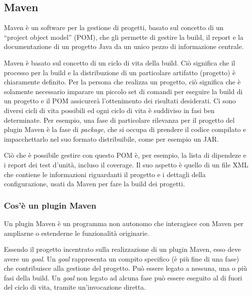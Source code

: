     \subsection{Maven} \label{mavenSection} %
        
    Maven \cite{site:maven-introduzione} è un software per la gestione di progetti, basato sul concetto di un ``project object model'' (POM), che gli permette di gestire la build, il report e la documentazione di un progetto Java da un unico pezzo di informazione centrale.

    Maven è basato sul concetto di un ciclo di vita della build.
    Ciò significa che il processo per la build e la distribuzione di un particolare artifatto (progetto) è chiaramente definito. 
    Per la persona che realizza un progetto, ciò significa che è solamente necessario imparare un piccolo set di comandi per eseguire la build di un progetto e il POM assicurerà l'ottenimento dei risultati desiderati.
    Ci sono diversi cicli di vita possibili ed ogni ciclo di vita è suddiviso in fasi ben determinate.
    Per esempio, una fase di particolare rilevanza per il progetto del plugin Maven è la fase di \emph{package}, che si occupa di prendere il codice compilato e impacchettarlo nel suo formato distribuibile, come per esempio un JAR. 


    Ciò che è possibile gestire con questo POM è, per esempio, la lista di dipendeze e i report dei test d'unità, incluso il coverage.
    Il suo aspetto è quello di un file XML che contiene le informazioni riguardanti il progetto e i dettagli della configurazione, usati da Maven per fare la build dei progetti.

    \subsubsection{Cos'è un plugin Maven}

    Un plugin Maven è un programma non autonomo che interagisce con Maven per ampliarne o estenderne le funzionalità originarie.

    Essendo il progetto incentrato sulla realizzazione di un plugin Maven, esso deve avere un \emph{goal}.
    Un \emph{goal} rappresenta un compito specifico (è più fine di una fase) che contribuisce alla gestione del progetto.
    Può essere legato a nessuna, una o più fasi della build.
    Un \emph{goal} non legato ad alcuna fase può essere eseguito al di fuori del ciclo di vita, tramite un'invocazione diretta.


